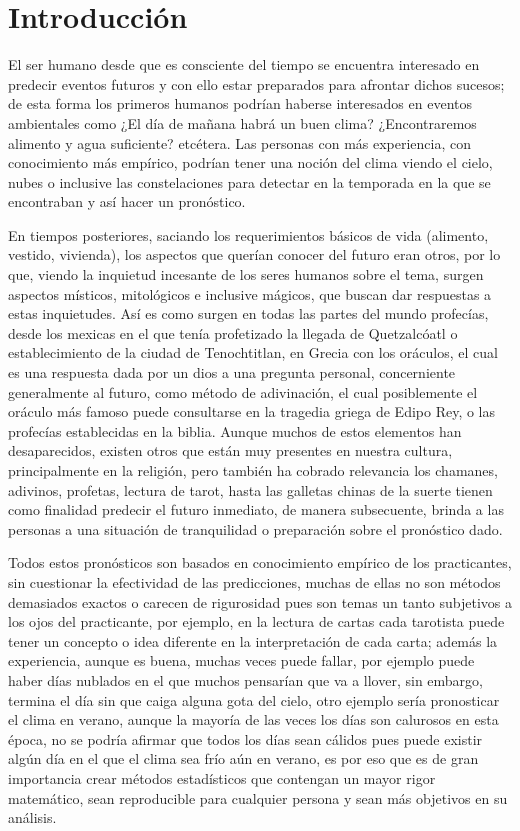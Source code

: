 \documentclass[
  spanish,
]{book}
\theoremstyle{remark}
\begin{document}
\hypertarget{introducciuxf3n}{%
\section{Introducción}\label{introducciuxf3n}}

El ser humano desde que es consciente del tiempo se encuentra interesado en predecir eventos futuros y con ello estar preparados para afrontar dichos sucesos; de esta forma los primeros humanos podrían haberse interesados en eventos ambientales como ¿El día de mañana habrá un buen clima? ¿Encontraremos alimento y agua suficiente? etcétera. Las personas con más experiencia, con conocimiento más empírico, podrían tener una noción del clima viendo el cielo, nubes o inclusive las constelaciones para detectar en la temporada en la que se encontraban y así hacer un pronóstico.

En tiempos posteriores, saciando los requerimientos básicos de vida (alimento, vestido, vivienda), los aspectos que querían conocer del futuro eran otros, por lo que, viendo la inquietud incesante de los seres humanos sobre el tema, surgen aspectos místicos, mitológicos e inclusive mágicos, que buscan dar respuestas a estas inquietudes. Así es como surgen en todas las partes del mundo profecías, desde los mexicas en el que tenía profetizado la llegada de Quetzalcóatl o establecimiento de la ciudad de Tenochtitlan, en Grecia con los oráculos, el cual es una respuesta dada por un dios a una pregunta personal, concerniente generalmente al futuro, como método de adivinación, el cual posiblemente el oráculo más famoso puede consultarse en la tragedia griega de Edipo Rey, o las profecías establecidas en la biblia. Aunque muchos de estos elementos han desaparecidos, existen otros que están muy presentes en nuestra cultura, principalmente en la religión, pero también ha cobrado relevancia los chamanes, adivinos, profetas, lectura de tarot, hasta las galletas chinas de la suerte tienen como finalidad predecir el futuro inmediato, de manera subsecuente, brinda a las personas a una situación de tranquilidad o preparación sobre el pronóstico dado.

Todos estos pronósticos son basados en conocimiento empírico de los practicantes, sin cuestionar la efectividad de las predicciones, muchas de ellas no son métodos demasiados exactos o carecen de rigurosidad pues son temas un tanto subjetivos a los ojos del practicante, por ejemplo, en la lectura de cartas cada tarotista puede tener un concepto o idea diferente en la interpretación de cada carta; además la experiencia, aunque es buena, muchas veces puede fallar, por ejemplo puede haber días nublados en el que muchos pensarían que va a llover, sin embargo, termina el día sin que caiga alguna gota del cielo, otro ejemplo sería pronosticar el clima en verano, aunque la mayoría de las veces los días son calurosos en esta época, no se podría afirmar que todos los días sean cálidos pues puede existir algún día en el que el clima sea frío aún en verano, es por eso que es de gran importancia crear métodos estadísticos que contengan un mayor rigor matemático, sean reproducible para cualquier persona y sean más objetivos en su análisis.
\end{document}
